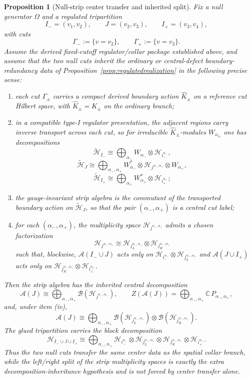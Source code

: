 \documentclass[11pt]{article}
\newtheorem{proposition}[theorem]{Proposition}
\begin{document}
\begin{proposition}[Null-strip center transfer and inherited split]\label{prop:nullec}
Fix a null generator \(\Omega\) and a regulated tripartition
\[
I_-=(v_1,v_2),\qquad
J=(v_2,v_3),\qquad
I_+=(v_3,v_4),
\]
with cuts
\[
\Gamma_-:=\{v=v_2\},
\qquad
\Gamma_+:=\{v=v_3\}.
\]
Assume the derived fixed-cutoff regulator/collar package established above, and assume that the two null cuts inherit the ordinary or central-defect boundary-redundancy data of Proposition~\ref{prop:regulatedrealization} in the following precise sense:
\begin{enumerate}[leftmargin=2em,label=(\roman*)]
\item each cut \(\Gamma_\pm\) carries a compact derived boundary action \(\widehat K_\pm\) on a reference cut Hilbert space, with \(\widehat K_\pm=K_\pm\) on the ordinary branch;
\item in a compatible type-I regulator presentation, the adjacent regions carry inverse transport across each cut, so for irreducible \(\widehat K_\pm\)-modules \(W_{\alpha_\pm}\) one has decompositions
\[
\tilde{\mathcal H}_{I_-}
\cong
\bigoplus_{\alpha_-}
W_{\alpha_-}\otimes \mathcal H_{i_-^{\alpha_-}},
\]
\[
\tilde{\mathcal H}_{J}
\cong
\bigoplus_{\alpha_-,\alpha_+}
W_{\alpha_-}^{*}\otimes
\mathcal H_{j^{\alpha_-,\alpha_+}}\otimes
W_{\alpha_+},
\]
\[
\tilde{\mathcal H}_{I_+}
\cong
\bigoplus_{\alpha_+}
W_{\alpha_+}^{*}\otimes \mathcal H_{i_+^{\alpha_+}};
\]
\item the gauge-invariant strip algebra is the commutant of the transported boundary action on \(\tilde{\mathcal H}_J\), so that the pair \((\alpha_-,\alpha_+)\) is a central cut label;
\item for each \((\alpha_-,\alpha_+)\), the multiplicity space \(\mathcal H_{j^{\alpha_-,\alpha_+}}\) admits a chosen factorization
\[
\mathcal H_{j^{\alpha_-,\alpha_+}}
\cong
\mathcal H_{j_L^{\alpha_-,\alpha_+}}\otimes
\mathcal H_{j_R^{\alpha_-,\alpha_+}}
\]
such that, blockwise, \(\mathcal A(I_-\cup J)\) acts only on
\(\mathcal H_{i_-^{\alpha_-}}\otimes \mathcal H_{j_L^{\alpha_-,\alpha_+}}\)
and \(\mathcal A(J\cup I_+)\) acts only on
\(\mathcal H_{j_R^{\alpha_-,\alpha_+}}\otimes \mathcal H_{i_+^{\alpha_+}}\).
\end{enumerate}
Then the strip algebra has the inherited central decomposition
\[
\mathcal A(J)
\cong
\bigoplus_{\alpha_-,\alpha_+}
\mathcal B(\mathcal H_{j^{\alpha_-,\alpha_+}}),
\qquad
Z(\mathcal A(J))
=
\bigoplus_{\alpha_-,\alpha_+}\mathbb C\,P_{\alpha_-,\alpha_+},
\]
and, under item (iv),
\[
\mathcal A(J)
\cong
\bigoplus_{\alpha_-,\alpha_+}
\mathcal B(\mathcal H_{j_L^{\alpha_-,\alpha_+}})
\otimes
\mathcal B(\mathcal H_{j_R^{\alpha_-,\alpha_+}}).
\]
The glued tripartition carries the block decomposition
\[
\mathcal H_{I_-\cup J\cup I_+}
\cong
\bigoplus_{\alpha_-,\alpha_+}
\mathcal H_{i_-^{\alpha_-}}
\otimes
\mathcal H_{j_L^{\alpha_-,\alpha_+}}
\otimes
\mathcal H_{j_R^{\alpha_-,\alpha_+}}
\otimes
\mathcal H_{i_+^{\alpha_+}}.
\]
Thus the two null cuts transfer the same center data as the spatial collar branch, while the left/right split of the strip multiplicity spaces is exactly the extra decomposition-inheritance hypothesis and is not forced by center transfer alone.
\end{proposition}
\end{document}
